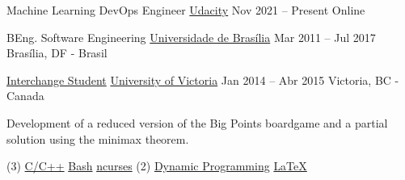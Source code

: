 \par
{}

\cveducation
{Machine Learning DevOps Engineer}
{\href{https://www.udacity.com/course/machine-learning-dev-ops-engineer-nanodegree--nd0821}{Udacity}}
{Nov 2021 -- Present}
{Online}

\bigskip

\cveducation
{BEng. Software Engineering}
{\href{https://fga.unb.br/software}{Universidade de Brasília}}
{Mar 2011 -- Jul 2017}
{Brasília, DF - Brasil}

\smallskip

\cveducation
{\footnotesize\faExchange\hspace{0.7em}\small\mdseries\href{http://www.cienciasemfronteiras.gov.br/web/csf/o-programa}{Interchange Student}}
{\href{https://www.uvic.ca/}{University of Victoria}}
{Jan 2014 -- Abr 2015}
{Victoria, BC - Canada}
\smallskip


\bigskip



{\smallskip\justifying
	{\faAngleRight} {\color{description}Development of a reduced version of the Big Points boardgame and a partial solution using the minimax theorem.}
\par}

\vspace{-0.5mm}
\begin{tasks}[after-item-skip=-0.5mm, label-offset=0.5mm, item-indent=5.0mm, label-align=left, label={\scriptsize\faCode}, label-format={\scriptsize\color{tech}}, item-format={\bfseries\footnotesize\color{emphasis}}](3)
	\task \href{https://www.cplusplus.com/}{C/C++}
	\task \href{https://www.gnu.org/software/bash/}{Bash}
	\task \href{https://invisible-island.net/ncurses/announce.html}{ncurses}
	\task*(2) \href{https://en.wikipedia.org/wiki/Dynamic_programming}{Dynamic Programming}
	\task \href{http://www.scrummanifesto.org/}{\LaTeX}
\end{tasks}

